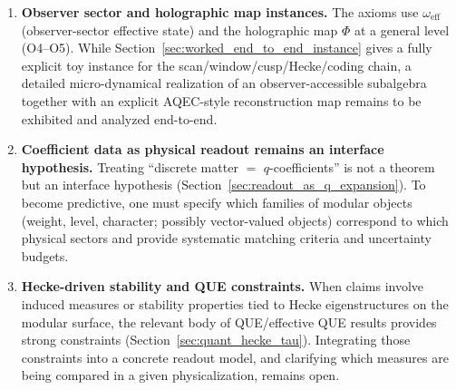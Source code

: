 \begin{enumerate}
  \item \textbf{Observer sector and holographic map instances.}
  The axioms use $\omega_{\mathrm{eff}}$ (observer-sector effective state) and the holographic map $\Phi$ at a general level (O4--O5). While Section~\ref{sec:worked_end_to_end_instance} gives a fully explicit toy instance for the scan/window/cusp/Hecke/coding chain, a detailed micro-dynamical realization of an observer-accessible subalgebra together with an explicit AQEC-style reconstruction map remains to be exhibited and analyzed end-to-end.

  \item \textbf{Coefficient data as physical readout remains an interface hypothesis.}
  Treating ``discrete matter $=$ $q$-coefficients'' is not a theorem but an interface hypothesis (Section~\ref{sec:readout_as_q_expansion}). To become predictive, one must specify which families of modular objects (weight, level, character; possibly vector-valued objects) correspond to which physical sectors and provide systematic matching criteria and uncertainty budgets.

  \item \textbf{Hecke-driven stability and QUE constraints.}
  When claims involve induced measures or stability properties tied to Hecke eigenstructures on the modular surface, the relevant body of QUE/effective QUE results provides strong constraints (Section~\ref{sec:quant_hecke_tau}). Integrating those constraints into a concrete readout model, and clarifying which measures are being compared in a given physicalization, remains open.
\end{enumerate}


